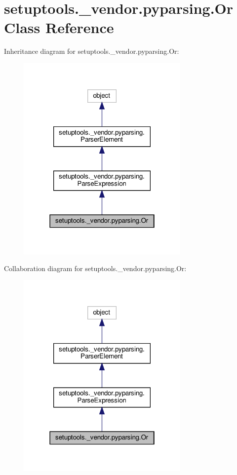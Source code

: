 \hypertarget{classsetuptools_1_1__vendor_1_1pyparsing_1_1Or}{}\section{setuptools.\+\_\+vendor.\+pyparsing.\+Or Class Reference}
\label{classsetuptools_1_1__vendor_1_1pyparsing_1_1Or}


Inheritance diagram for setuptools.\+\_\+vendor.\+pyparsing.\+Or\+:
\nopagebreak
\begin{figure}[H]
\begin{center}
\leavevmode
\includegraphics[width=238pt]{classsetuptools_1_1__vendor_1_1pyparsing_1_1Or__inherit__graph}
\end{center}
\end{figure}


Collaboration diagram for setuptools.\+\_\+vendor.\+pyparsing.\+Or\+:
\nopagebreak
\begin{figure}[H]
\begin{center}
\leavevmode
\includegraphics[width=238pt]{classsetuptools_1_1__vendor_1_1pyparsing_1_1Or__coll__graph}
\end{center}
\end{figure}

